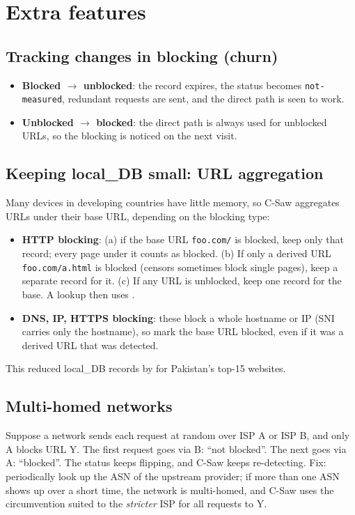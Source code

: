 \section{Extra features}

\subsection{Tracking changes in blocking (churn)}
\begin{itemize}
  \item \textbf{Blocked $\to$ unblocked}: the record expires, the status becomes \texttt{not-measured}, redundant requests are sent, and the direct path is seen
        to work.
  \item \textbf{Unblocked $\to$ blocked}: the direct path is always used for unblocked URLs, so the blocking is noticed on the next visit.
\end{itemize}

\subsection{Keeping local\_DB small: URL aggregation}
Many devices in developing countries have little memory, so C-Saw aggregates URLs under their base URL, depending on the blocking type:
\begin{itemize}
  \item \textbf{HTTP blocking}: (a) if the base URL \texttt{foo.com/} is blocked, keep only that record; every page under it counts as blocked. (b) If only
        a derived URL \texttt{foo.com/a.html} is blocked (censors sometimes block single pages), keep a separate record for it. (c) If any URL is unblocked,
        keep one record for the base. A lookup then uses .
  \item \textbf{DNS, IP, HTTPS blocking}: these block a whole hostname or IP (SNI carries only the hostname), so mark the base URL blocked, even if it was a
        derived URL that was detected.
\end{itemize}
This reduced local\_DB records by  for Pakistan's top-15 websites.

\subsection{Multi-homed networks}
Suppose a network sends each request at random over ISP A or ISP B, and only A blocks URL Y. The first request goes via B: ``not blocked''. The next goes via A:
``blocked''. The status keeps flipping, and C-Saw keeps re-detecting. Fix: periodically look up the ASN of the upstream provider; if more than one ASN shows up
over a short time, the network is multi-homed, and C-Saw uses the circumvention suited to the \emph{stricter} ISP for all requests to Y.

